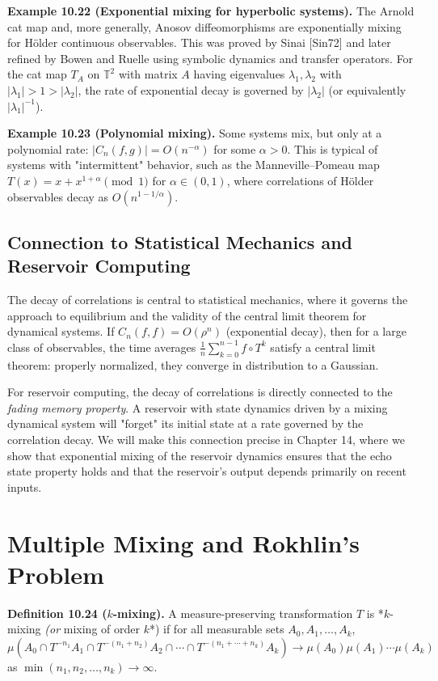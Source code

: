 \textbf{Example 10.22 (Exponential mixing for hyperbolic systems).} The Arnold cat map and, more generally, Anosov diffeomorphisms are exponentially mixing for Hölder continuous observables. This was proved by Sinai [Sin72] and later refined by Bowen and Ruelle using symbolic dynamics and transfer operators. For the cat map $T_A$ on $\mathbb{T}^2$ with matrix $A$ having eigenvalues $\lambda_1, \lambda_2$ with $|\lambda_1| > 1 > |\lambda_2|$, the rate of exponential decay is governed by $|\lambda_2|$ (or equivalently $|\lambda_1|^{-1}$).

\textbf{Example 10.23 (Polynomial mixing).} Some systems mix, but only at a polynomial rate: $|C_n(f,g)| = O(n^{-\alpha})$ for some $\alpha > 0$. This is typical of systems with "intermittent" behavior, such as the Manneville--Pomeau map $T(x) = x + x^{1+\alpha} \pmod{1}$ for $\alpha \in (0, 1)$, where correlations of Hölder observables decay as $O(n^{1 - 1/\alpha})$.

\subsection{Connection to Statistical Mechanics and Reservoir Computing}

The decay of correlations is central to statistical mechanics, where it governs the approach to equilibrium and the validity of the central limit theorem for dynamical systems. If $C_n(f, f) = O(\rho^n)$ (exponential decay), then for a large class of observables, the time averages $\frac{1}{n}\sum_{k=0}^{n-1} f \circ T^k$ satisfy a central limit theorem: properly normalized, they converge in distribution to a Gaussian.

For reservoir computing, the decay of correlations is directly connected to the \textit{fading memory property}. A reservoir with state dynamics driven by a mixing dynamical system will "forget" its initial state at a rate governed by the correlation decay. We will make this connection precise in Chapter 14, where we show that exponential mixing of the reservoir dynamics ensures that the echo state property holds and that the reservoir's output depends primarily on recent inputs.


\section{Multiple Mixing and Rokhlin's Problem}\label{sec:10.7}

\textbf{Definition 10.24 ($k$-mixing).} A measure-preserving transformation $T$ is *$k$-mixing\textit{ (or }mixing of order $k$*) if for all measurable sets $A_0, A_1, \ldots, A_k$,
\[
\mu\!\left(A_0 \cap T^{-n_1}A_1 \cap T^{-(n_1 + n_2)}A_2 \cap \cdots \cap T^{-(n_1 + \cdots + n_k)}A_k\right) \to \mu(A_0)\mu(A_1)\cdots\mu(A_k)
\]
as $\min(n_1, n_2, \ldots, n_k) \to \infty$.


